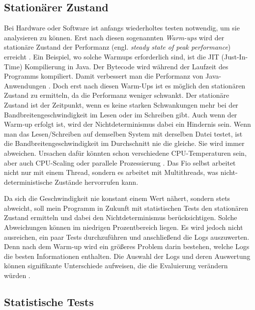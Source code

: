 \documentclass{article}
\begin{document}
\subsection{Stationärer Zustand}

Bei Hardware oder Software ist anfangs wiederholtes testen notwendig, um sie analysieren zu können. Erst nach diesen sogenannten \textit{Warm-ups} wird der stationäre Zustand der Performanz (engl. \textit{steady state of peak performance}) erreicht \cite{vmsHotandCold}. Ein Beispiel, wo solche Warmups erforderlich sind, ist die JIT (Just-In-Time) Kompilierung in Java. Der Bytecode wird während der Laufzeit des Programms kompiliert. Damit verbessert man die Performanz von Java-Anwendungen \cite{jit}. Doch erst nach diesen Warm-Ups ist es möglich den stationären Zustand zu ermitteln, da die Performanz weniger schwankt.
Der stationäre Zustand ist der Zeitpunkt, wenn es keine starken Schwankungen mehr bei der Bandbreitengeschwindigkeit im Lesen oder im Schreiben gibt. Auch wenn der Warm-up erfolgt ist, wird
der Nichtdeterminismus dabei ein Hindernis sein.
Wenn man das Lesen/Schreiben auf demselben System mit derselben Datei testet, ist die Bandbreitengeschwindigkeit im Durchschnitt nie die gleiche. Sie wird immer abweichen.
Ursachen dafür könnten schon verschiedene CPU-Temperaturen sein, aber auch CPU-Scaling oder parallele Prozessierung \cite{stasticsInPerformance}.
Das Fio selbst arbeitet nicht nur mit einem Thread, sondern es arbeitet mit Multithreads, was nicht-deterministische Zustände hervorrufen kann.

Da sich die Geschwindigkeit nie konstant einem Wert nähert, sondern stets abweicht, soll mein Programm in Zukunft mit statistischen Tests den stationären Zustand ermitteln und dabei den Nichtdeterminismus berücksichtigen.
Solche Abweichungen können im niedrigen Prozentbereich liegen.
Es wird jedoch nicht ausreichen, ein paar Tests durchzuführen und anschließend die Logs auszuwerten.
Denn nach dem Warm-up wird ein größeres Problem darin bestehen, welche Logs die besten Informationen enthalten.
Die Auswahl der Logs und deren Auswertung können signifikante Unterschiede aufweisen, die die Evaluierung verändern würden \cite{whenStopPerformanceTest}.

\subsection{Statistische Tests}
\end{document}
